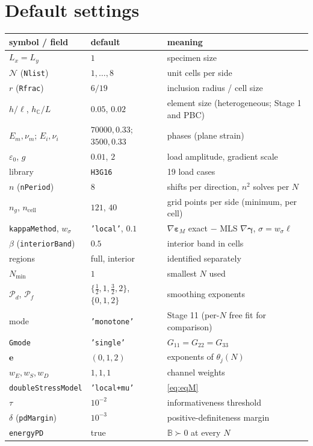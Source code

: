 \documentclass[11pt,a4paper]{article}
\newcommand{\C}{\mathbb{C}}                     %
\newcommand{\B}{\mathbb{B}}                     %
\newcommand{\epsM}{\bm{\varepsilon}_{M}}
\newcommand{\bgam}{\bm{\gamma}}
\newcommand{\code}[1]{\texttt{#1}}
\theoremstyle{plain}
\theoremstyle{remark}
\begin{document}
\appendix
\section{Default settings}
\begin{center}\small
\begin{longtable}{@{}lll@{}}
\toprule
symbol / field & default & meaning\\
\midrule
$L_x=L_y$ & $1$ & specimen size\\
$\mathcal N$ (\code{Nlist}) & $1,\dots,8$ & unit cells per side\\
$r$ (\code{Rfrac}) & $6/19$ & inclusion radius / cell size\\
$h/\ell$, $h_{\C}/L$ & $0.05$, $0.02$ & element size (heterogeneous; Stage 1 and PBC)\\
$E_m,\nu_m$; $E_i,\nu_i$ & $70000, 0.33$; $3500, 0.33$ & phases (plane strain)\\
$\varepsilon_0$, $g$ & $0.01$, $2$ & load amplitude, gradient scale\\
library & \code{H3G16} & 19 load cases\\
$n$ (\code{nPeriod}) & $8$ & shifts per direction, $n^2$ solves per $N$\\
$n_g$, $n_{\mathrm{cell}}$ & $121$, $40$ & grid points per side (minimum, per cell)\\
\code{kappaMethod}, $w_\sigma$ & \code{'local'}, $0.1$ & $\nabla\epsM$ exact $-$ MLS $\nabla\bgam$, $\sigma=w_\sigma\ell$\\
$\beta$ (\code{interiorBand}) & $0.5$ & interior band in cells\\
regions & full, interior & identified separately\\
$N_{\min}$ & $1$ & smallest $N$ used\\
$\mathcal P_d$, $\mathcal P_f$ & $\{\tfrac12,1,\tfrac32,2\}$, $\{0,1,2\}$ & smoothing exponents\\
mode & \code{'monotone'} & Stage 11 (per-$N$ free fit for comparison)\\
\code{Gmode} & \code{'single'} & $G_{11}=G_{22}=G_{33}$\\
$\bm e$ & $(0,1,2)$ & exponents of $\theta_j(N)$\\
$w_E,w_S,w_D$ & $1,1,1$ & channel weights\\
\code{doubleStressModel} & \code{'local+mu'} & \eqref{eq:eqM}\\
$\tau$ & $10^{-2}$ & informativeness threshold\\
$\delta$ (\code{pdMargin}) & $10^{-3}$ & positive-definiteness margin\\
\code{energyPD} & true & $\B\succ0$ at every $N$\\
\bottomrule
\end{longtable}
\end{center}
\end{document}
